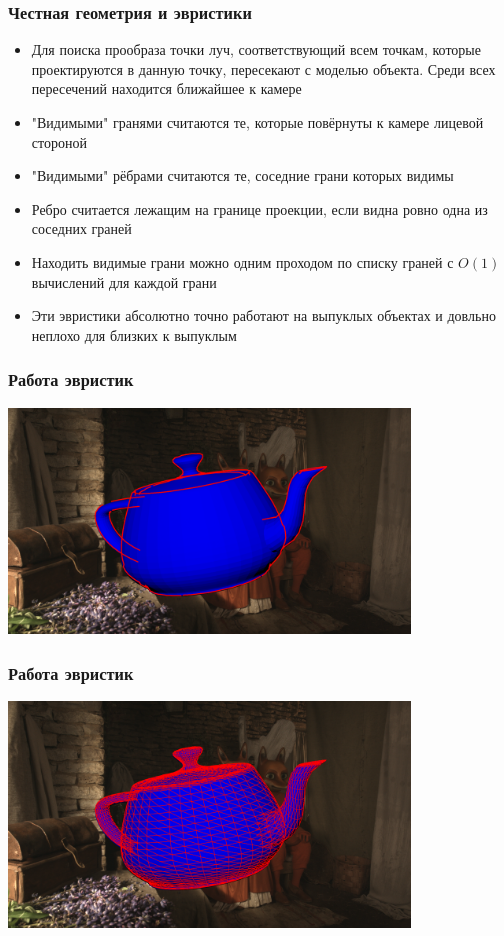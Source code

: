 \begin{frame}\frametitle{Честная геометрия и эвристики}
    \begin{itemize}
    \item Для поиска прообраза точки луч, соответствующий всем точкам, которые проектируются в данную точку, пересекают с моделью объекта. Среди всех пересечений находится ближайшее к камере
        \pause
        \item "Видимыми" гранями считаются те, которые повёрнуты к камере лицевой стороной
        \pause
        \item "Видимыми" рёбрами считаются те, соседние грани которых видимы
        \pause
        \item Ребро считается лежащим на границе проекции, если видна ровно одна из соседних граней
        \pause
        \item Находить видимые грани можно одним проходом по списку граней с $O(1)$ вычислений для каждой грани
        \item Эти эвристики абсолютно точно работают на выпуклых объектах и довльно неплохо для близких к выпуклым
    \end{itemize}
\end{frame}

\begin{frame}\frametitle{Работа эвристик}
    \begin{center}
        \includegraphics[height=6cm]{lobanov_imgs/border.png}
    \end{center}
\end{frame}

\begin{frame}\frametitle{Работа эвристик}
    \begin{center}
        \includegraphics[height=6cm]{lobanov_imgs/visible_edges.png}
    \end{center}
\end{frame}

